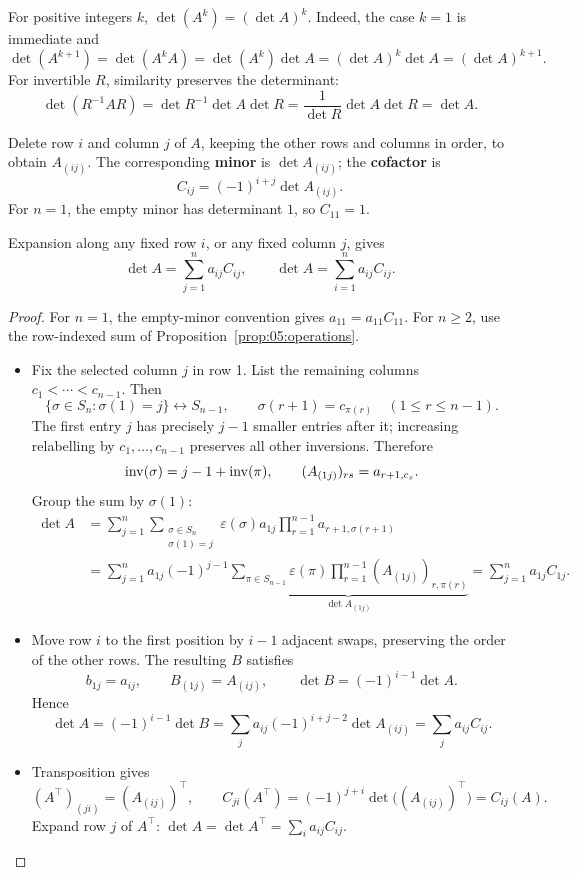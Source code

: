 For positive integers \(k\),
\(\det(A^k)=(\det A)^k\). Indeed, the case \(k=1\) is immediate and
\[
\det(A^{k+1})=\det(A^kA)=\det(A^k)\det A
=(\det A)^k\det A=(\det A)^{k+1}.
\]
For invertible \(R\), similarity preserves the determinant:
\[
\det(R^{-1}AR)=\det R^{-1}\det A\det R
=\frac1{\det R}\det A\det R=\det A.
\]

Delete row \(i\) and column \(j\)
of \(A\), keeping the other rows and columns in order, to obtain \(A_{(ij)}\).
The corresponding \textbf{minor} is \(\det A_{(ij)}\);
the \textbf{cofactor} is
\[
C_{ij}=(-1)^{i+j}\det A_{(ij)}.
\]
For \(n=1\), the empty minor has determinant \(1\), so \(C_{11}=1\).

\begin{theorem}\label{thm:05:cofactor}
Expansion along any fixed row \(i\), or any fixed column \(j\), gives
\[
\det A=\sum_{j=1}^n a_{ij}C_{ij},
\qquad
\det A=\sum_{i=1}^n a_{ij}C_{ij}.
\]
\end{theorem}
\begin{proof}
For \(n=1\), the empty-minor convention gives \(a_{11}=a_{11}C_{11}\).
For \(n\geqslant2\), use the row-indexed sum of Proposition~\ref{prop:05:operations}.
\begin{itemize}
\item Fix the selected column \(j\) in row 1. List the remaining columns
  \(c_1<\cdots<c_{n-1}\). Then
  \[
  \{\sigma\in S_n:\sigma(1)=j\}
  \longleftrightarrow S_{n-1},\qquad
  \sigma(r+1)=c_{\pi(r)}\quad(1\leqslant r\leqslant n-1).
  \]
  The first entry \(j\) has precisely \(j-1\) smaller entries after it;
  increasing relabelling by \(c_1,\ldots,c_{n-1}\) preserves all other inversions.
  Therefore
  \[
  \operatorname{inv}(\sigma)=j-1+\operatorname{inv}(\pi),\qquad
  (A_{(1j)})_{rs}=a_{r+1,c_s}.
  \]
  Group the sum by \(\sigma(1)\):
  \[
  \begin{aligned}
  \det A
  &=\sum_{j=1}^n\sum_{\substack{\sigma\in S_n\\\sigma(1)=j}}
          \varepsilon(\sigma)a_{1j}\prod_{r=1}^{n-1}a_{r+1,\sigma(r+1)}\\
  &=\sum_{j=1}^n a_{1j}(-1)^{j-1}
          \underbrace{\sum_{\pi\in S_{n-1}}\varepsilon(\pi)
                \prod_{r=1}^{n-1}(A_{(1j)})_{r,\pi(r)}}_{\det A_{(1j)}}
   =\sum_{j=1}^n a_{1j}C_{1j}.
  \end{aligned}
  \]
\item Move row \(i\) to the first position by \(i-1\) adjacent swaps,
  preserving the order of the other rows. The resulting \(B\) satisfies
  \[
  b_{1j}=a_{ij},\qquad B_{(1j)}=A_{(ij)},\qquad
  \det B=(-1)^{i-1}\det A.
  \]
  Hence
  \[
  \det A=(-1)^{i-1}\det B
   =\sum_j a_{ij}(-1)^{i+j-2}\det A_{(ij)}
   =\sum_j a_{ij}C_{ij}.
  \]
\item Transposition gives
  \[
  (A^\top)_{(ji)}=(A_{(ij)})^\top,\qquad
  C_{ji}(A^\top)=(-1)^{j+i}\det\bigl((A_{(ij)})^\top\bigr)=C_{ij}(A).
  \]
  Expand row \(j\) of \(A^\top\):
  \(\det A=\det A^\top=\sum_i a_{ij}C_{ij}\).
\end{itemize}
\end{proof}

